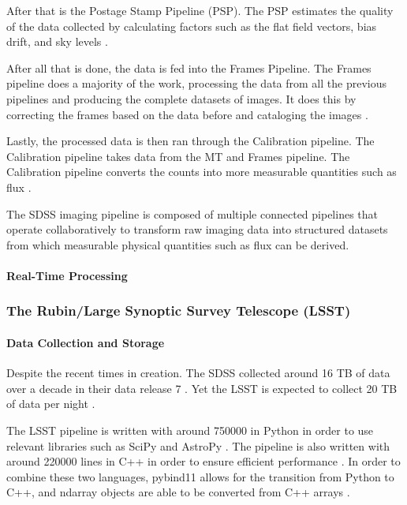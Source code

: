 \documentclass[preprint,linenumbers, longauthor]{aastex631}
\begin{document}
  After that is the Postage Stamp Pipeline (PSP). 
  The PSP estimates the quality of the data collected by calculating factors such as the flat field vectors, bias drift, and sky levels \cite{luptonSDSSImagingPipelines2001}.

  After all that is done, the data is fed into the Frames Pipeline. The Frames pipeline does a majority of the work, processing the data from all the previous pipelines and producing the complete datasets of images.
  It does this by correcting the frames based on the data before and cataloging the images \cite{luptonSDSSImagingPipelines2001}.

  Lastly, the processed data is then ran through the Calibration pipeline. The Calibration pipeline takes data from the MT and Frames pipeline. The Calibration pipeline converts the counts into more measurable quantities such as flux \cite{luptonSDSSImagingPipelines2001}.

The SDSS imaging pipeline is composed of multiple connected pipelines that operate collaboratively to transform raw imaging data into structured datasets from which measurable physical quantities such as flux can be derived.

\paragraph{Real-Time Processing} 

\subsubsection{The Rubin/Large Synoptic Survey Telescope (LSST)}
\paragraph{Data Collection and Storage}
Despite the recent times in creation. The SDSS collected around 16 TB of data over a decade in their data release 7 \citep{juricLSSTDataManagement2017}. Yet the LSST is expected to collect 20 TB of data per night \citep{nsf-doeverac.rubinobservatoryPSTN019LSSTScience2025}.

The LSST pipeline is written with around 750000 in Python in order to use relevant libraries such as SciPy and AstroPy \citep{nsf-doeverac.rubinobservatoryPSTN019LSSTScience2025}.
The pipeline is also written with around 220000 lines in C++ in order to ensure efficient performance \citep{nsf-doeverac.rubinobservatoryPSTN019LSSTScience2025}.
In order to combine these two languages, pybind11 allows for the transition from Python to C++, and ndarray objects are able to be converted from C++ arrays \citep{nsf-doeverac.rubinobservatoryPSTN019LSSTScience2025}.
\end{document}
